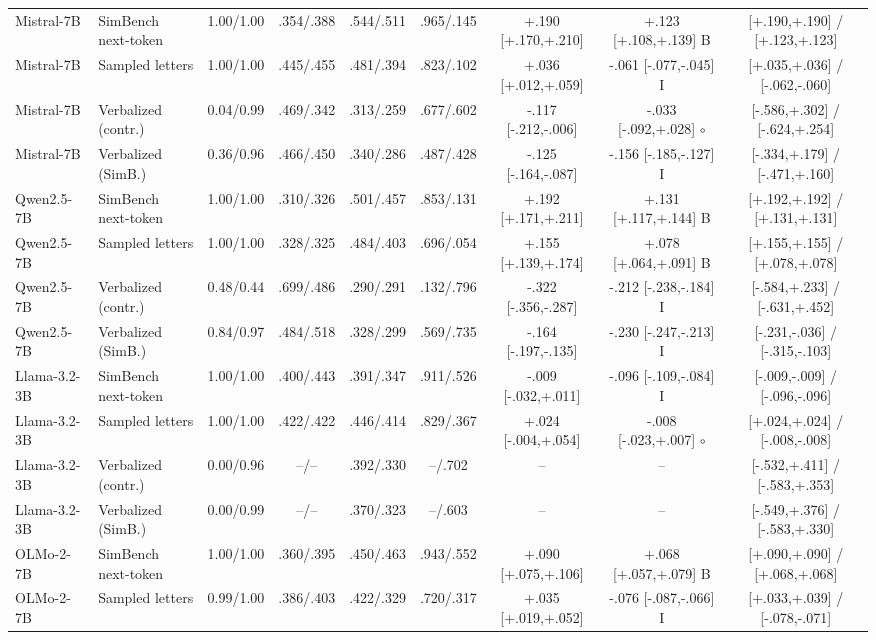 \begin{table}[t]
\begin{tabular}{@{}llccccccc@{}}
Mistral-7B & SimBench next-token & 1.00/1.00 & .354/.388 & .544/.511 & .965/.145 & +.190 [+.170,+.210] & +.123 [+.108,+.139] B & [+.190,+.190] / [+.123,+.123] \\
Mistral-7B & Sampled letters & 1.00/1.00 & .445/.455 & .481/.394 & .823/.102 & +.036 [+.012,+.059] & -.061 [-.077,-.045] I & [+.035,+.036] / [-.062,-.060] \\
Mistral-7B & Verbalized (contr.) & 0.04/0.99 & .469/.342 & .313/.259 & .677/.602 & -.117 [-.212,-.006] & -.033 [-.092,+.028] $\circ$ & [-.586,+.302] / [-.624,+.254] \\
Mistral-7B & Verbalized (SimB.) & 0.36/0.96 & .466/.450 & .340/.286 & .487/.428 & -.125 [-.164,-.087] & -.156 [-.185,-.127] I & [-.334,+.179] / [-.471,+.160] \\
Qwen2.5-7B & SimBench next-token & 1.00/1.00 & .310/.326 & .501/.457 & .853/.131 & +.192 [+.171,+.211] & +.131 [+.117,+.144] B & [+.192,+.192] / [+.131,+.131] \\
Qwen2.5-7B & Sampled letters & 1.00/1.00 & .328/.325 & .484/.403 & .696/.054 & +.155 [+.139,+.174] & +.078 [+.064,+.091] B & [+.155,+.155] / [+.078,+.078] \\
Qwen2.5-7B & Verbalized (contr.) & 0.48/0.44 & .699/.486 & .290/.291 & .132/.796 & -.322 [-.356,-.287] & -.212 [-.238,-.184] I & [-.584,+.233] / [-.631,+.452] \\
Qwen2.5-7B & Verbalized (SimB.) & 0.84/0.97 & .484/.518 & .328/.299 & .569/.735 & -.164 [-.197,-.135] & -.230 [-.247,-.213] I & [-.231,-.036] / [-.315,-.103] \\
Llama-3.2-3B & SimBench next-token & 1.00/1.00 & .400/.443 & .391/.347 & .911/.526 & -.009 [-.032,+.011] & -.096 [-.109,-.084] I & [-.009,-.009] / [-.096,-.096] \\
Llama-3.2-3B & Sampled letters & 1.00/1.00 & .422/.422 & .446/.414 & .829/.367 & +.024 [-.004,+.054] & -.008 [-.023,+.007] $\circ$ & [+.024,+.024] / [-.008,-.008] \\
Llama-3.2-3B & Verbalized (contr.) & 0.00/0.96 & --/-- & .392/.330 & --/.702 & -- & -- & [-.532,+.411] / [-.583,+.353] \\
Llama-3.2-3B & Verbalized (SimB.) & 0.00/0.99 & --/-- & .370/.323 & --/.603 & -- & -- & [-.549,+.376] / [-.583,+.330] \\
OLMo-2-7B & SimBench next-token & 1.00/1.00 & .360/.395 & .450/.463 & .943/.552 & +.090 [+.075,+.106] & +.068 [+.057,+.079] B & [+.090,+.090] / [+.068,+.068] \\
OLMo-2-7B & Sampled letters & 0.99/1.00 & .386/.403 & .422/.329 & .720/.317 & +.035 [+.019,+.052] & -.076 [-.087,-.066] I & [+.033,+.039] / [-.078,-.071] \\

\end{tabular}
\end{table}
